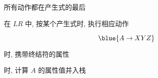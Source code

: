 \begin{frame}{}
  
\end{frame}

\begin{frame}{}
  \begin{center}
    \begin{columns}
        \begin{center}
        \end{center}
        \begin{center}
        \end{center}
    \end{columns}

    \pause
    \vspace{0.80cm}
     所有动作都在产生式的最后

    \vspace{0.30cm}
    在 $LR$ 中, 按某个产生式时, 执行相应动作
  \end{center}
\end{frame}

\begin{frame}{}
  \begin{center}
    \[
      \blue{A \to X Y Z}
    \]


    时, 携带终结符的属性

    \vspace{0.30cm}
    时, 计算 $A$ 的属性值并入栈
  \end{center}
\end{frame}

\begin{frame}{}
  
\end{frame}

